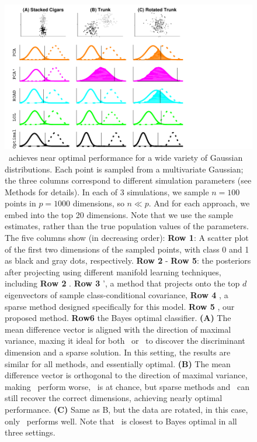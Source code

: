 \documentclass[10pt]{article}
\begin{document}
\begin{figure}[h!]%
\centering
\includegraphics[width=0.8\linewidth,trim=0in 0in 1.5in 0in,clip=true]{../Figs/cigars_est.pdf}%
\caption{
\Lol~achieves near optimal performance for a wide variety of Gaussian distributions.
Each point is sampled from a multivariate Gaussian;
the three columns correspond to different simulation parameters (see Methods for details).
In each of 3 simulations, we sample $n=100$ points in $p=1000$ dimensions, so $n \ll p$. 
And for each approach, we embed into the top 20 dimensions. Note that we use the sample estimates, rather than the true population values of the parameters.  The five columns show (in decreasing order):
\textbf{Row 1}: A scatter plot of the first two dimensions of the sampled points, with class 0 and 1 as black and gray dots, respectively.
\textbf{Row 2} - \textbf{Row 5}: the posteriors after projecting using different manifold learning techniques, including 
\textbf{Row 2} \Pca.
\textbf{Row 3} \Pca', a method that projects onto the top $d$ eigenvectors of  sample class-conditional covariance,
\textbf{Row 4} \Road, a sparse method designed specifically for this model.
\textbf{Row 5} \Lol, our  proposed method.
\textbf{Row6} the Bayes optimal classifier.
%
\textbf{(A)} The mean difference vector is aligned with the direction of maximal variance, maxing it ideal for both \Pca~or \Rrlda~to discover the discriminant dimension and a sparse solution. In this setting, the results are  similar for all methods, and essentially optimal.
\textbf{(B)} The mean difference vector is orthogonal to the direction of maximal variance, making \Pca~perform worse, \Rrlda~is at chance, but sparse methods and \Lol~can still recover the correct dimensions, achieving nearly optimal performance.
\textbf{(C)} Same as B, but the data are rotated, in this case, only \Lol~performs well.
Note that \Lol~is closest to Bayes optimal in all three settings.
}
\label{f:cigars}
\end{figure}
\end{document}
